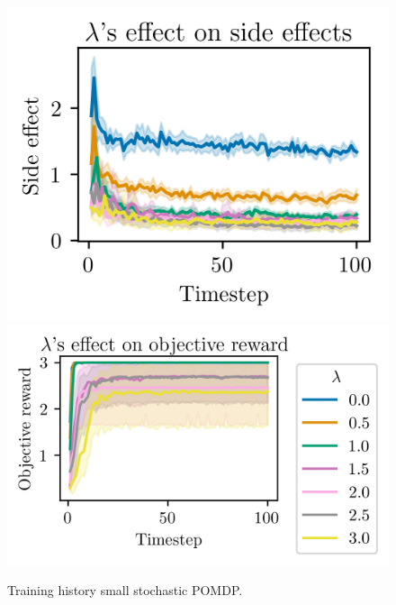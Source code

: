 \documentclass[12pt,A4]{report}
\theoremstyle{definition}
\begin{document}
\begin{appendices}
\begin{figure}[H]
  \centering
  \includegraphics{"./figures/pomdp_8x8_stochastic_side_effects.png"}
  \includegraphics{"./figures/pomdp_8x8_stochastic_objective_reward.png"}
  \caption{Training history small stochastic POMDP.}
  \label{fig:results_static_8x8_stochastic}
\end{figure}


\end{appendices}
\end{document}
